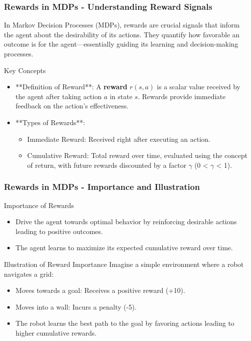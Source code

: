 \documentclass[aspectratio=169]{beamer}
\begin{document}
\begin{frame}[fragile]
    \frametitle{Rewards in MDPs - Understanding Reward Signals}
    In Markov Decision Processes (MDPs), rewards are crucial signals that inform the agent about the desirability of its actions. They quantify how favorable an outcome is for the agent—essentially guiding its learning and decision-making processes.

    \begin{block}{Key Concepts}
        \begin{itemize}
            \item **Definition of Reward**: A \textbf{reward} $r(s, a)$ is a scalar value received by the agent after taking action $a$ in state $s$. Rewards provide immediate feedback on the action’s effectiveness.
            \item **Types of Rewards**:
                \begin{itemize}
                    \item Immediate Reward: Received right after executing an action.
                    \item Cumulative Reward: Total reward over time, evaluated using the concept of return, with future rewards discounted by a factor $\gamma$ (0 < $\gamma$ < 1).
                \end{itemize}
        \end{itemize}
    \end{block}
\end{frame}

\begin{frame}[fragile]
    \frametitle{Rewards in MDPs - Importance and Illustration}
    \begin{block}{Importance of Rewards}
        \begin{itemize}
            \item Drive the agent towards optimal behavior by reinforcing desirable actions leading to positive outcomes.
            \item The agent learns to maximize its expected cumulative reward over time.
        \end{itemize}
    \end{block}

    \begin{block}{Illustration of Reward Importance}
        Imagine a simple environment where a robot navigates a grid:
        \begin{itemize}
            \item Moves towards a goal: Receives a positive reward (+10).
            \item Moves into a wall: Incurs a penalty (-5).
            \item The robot learns the best path to the goal by favoring actions leading to higher cumulative rewards.
        \end{itemize}
    \end{block}
\end{frame}
\end{document}
